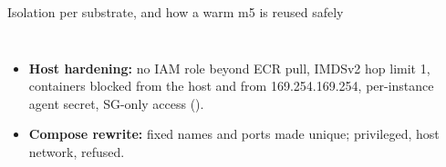 \begin{frame}{Isolation per substrate, and how a warm m5 is reused safely}
\begin{columns}[T]
\par\vspace{1mm}\raggedright
\begin{itemize}\tiny\setlength{\itemsep}{0.4mm}
\item \textbf{Host hardening:} no IAM role beyond ECR pull, IMDSv2 hop limit 1, containers blocked from the host and from 169.254.169.254, per-instance agent secret, SG-only access ().
\item \textbf{Compose rewrite:} fixed names and ports made unique; privileged, host network,  refused.
\end{itemize}
\end{columns}
\end{frame}


